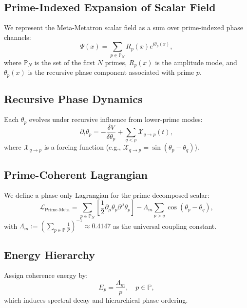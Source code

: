 \documentclass[11pt]{article}
\newcommand{\Xi}{\mathcal{X}}
\begin{document}
\subsection{Prime-Indexed Expansion of Scalar Field}
We represent the Meta-Metatron scalar field as a sum over prime-indexed phase channels:
\begin{equation}
\Psi(x) = \sum_{p \in \mathbb{P}_N} R_p(x) e^{i \theta_p(x)},
\end{equation}
where $\mathbb{P}_N$ is the set of the first $N$ primes, $R_p(x)$ is the amplitude mode, and $\theta_p(x)$ is the recursive phase component associated with prime $p$.

\subsection{Recursive Phase Dynamics}
Each $\theta_p$ evolves under recursive influence from lower-prime modes:
\begin{equation}
\partial_t \theta_p = -\frac{\delta V}{\delta \theta_p} + \sum_{q < p} \Xi_{q \rightarrow p}(t),
\end{equation}
where $\Xi_{q \rightarrow p}$ is a forcing function (e.g., $\Xi_{q \rightarrow p} = \sin(\theta_p - \theta_q)$).

\subsection{Prime-Coherent Lagrangian}
We define a phase-only Lagrangian for the prime-decomposed scalar:
\begin{equation}
\mathcal{L}_{\text{Prime-Meta}} = \sum_{p \in \mathbb{P}_N} \left[ \frac{1}{2} \partial_\mu \theta_p \partial^\mu \theta_p \right] - \Lambda_m \sum_{p > q} \cos(\theta_p - \theta_q),
\end{equation}
with $\Lambda_m := \left( \sum_{p \in \mathbb{P}} \frac{1}{p} \right)^{-1} \approx 0.4147$ as the universal coupling constant.

\subsection{Energy Hierarchy}
Assign coherence energy by:
\begin{equation}
E_p = \frac{\Lambda_m}{p}, \quad p \in \mathbb{P},
\end{equation}
which induces spectral decay and hierarchical phase ordering.
\end{document}
